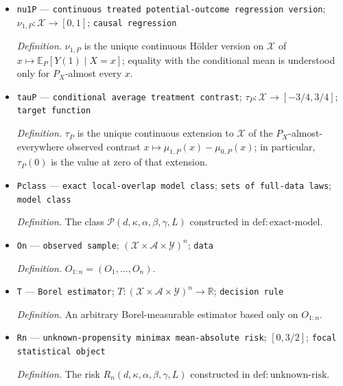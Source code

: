 \documentclass{article}
\begin{document}
\begin{itemize}
  \par\smallskip\noindent\emph{Definition.} \(\nu_{0,P}\) is the unique continuous H\"older version on \(\mathcal X\) of \(x\mapsto\mathbb E_P[Y(0)\mid X=x]\); equality with the conditional mean is understood only for \(P_X\)-almost every \(x\).
  \item \texttt{nu1P} --- \texttt{continuous treated potential-\allowbreak{}outcome regression version}; \(\nu_{1,P}:\mathcal X\to[0,1]\); \texttt{causal regression}
  \par\smallskip\noindent\emph{Definition.} \(\nu_{1,P}\) is the unique continuous H\"older version on \(\mathcal X\) of \(x\mapsto\mathbb E_P[Y(1)\mid X=x]\); equality with the conditional mean is understood only for \(P_X\)-almost every \(x\).
  \item \texttt{tauP} --- \texttt{conditional average treatment contrast}; \(\tau_P:\mathcal X\to[-3/4,3/4]\); \texttt{target function}
  \par\smallskip\noindent\emph{Definition.} \(\tau_P\) is the unique continuous extension to \(\mathcal X\) of the \(P_X\)-almost-everywhere observed contrast \(x\mapsto\mu_{1,P}(x)-\mu_{0,P}(x)\); in particular, \(\tau_P(0)\) is the value at zero of that extension.
  \item \texttt{Pclass} --- \texttt{exact local-\allowbreak{}overlap model class}; \texttt{sets of full-\allowbreak{}data laws}; \texttt{model class}
  \par\smallskip\noindent\emph{Definition.} The class \(\mathcal P(d,\kappa,\alpha,\beta,\gamma,L)\) constructed in \(\mathrm{def:exact\mbox{-}model}\).
  \item \texttt{On} --- \texttt{observed sample}; \((\mathcal X\times\mathcal A\times\mathcal Y)^n\); \texttt{data}
  \par\smallskip\noindent\emph{Definition.} \(O_{1:n}=(O_1,\ldots,O_n)\).
  \item \texttt{T} --- \texttt{Borel estimator}; \(T:(\mathcal X\times\mathcal A\times\mathcal Y)^n\to\mathbb R\); \texttt{decision rule}
  \par\smallskip\noindent\emph{Definition.} An arbitrary Borel-measurable estimator based only on \(O_{1:n}\).
  \item \texttt{Rn} --- \texttt{unknown-\allowbreak{}propensity minimax mean-\allowbreak{}absolute risk}; \([0,3/2]\); \texttt{focal statistical object}
  \par\smallskip\noindent\emph{Definition.} The risk \(R_n(d,\kappa,\alpha,\beta,\gamma,L)\) constructed in \(\mathrm{def:unknown\mbox{-}risk}\).

\end{itemize}
\end{document}
